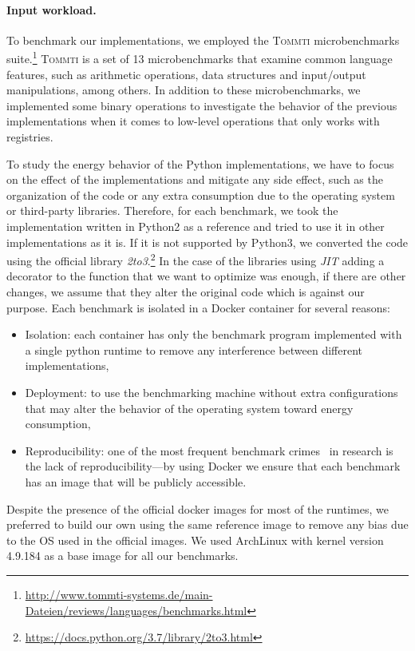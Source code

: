 \paragraph{Input workload.}
To benchmark our implementations, we employed the \textsc{Tommti} microbenchmarks suite.\footnote{\url{http://www.tommti-systems.de/main-Dateien/reviews/languages/benchmarks.html}}
\textsc{Tommti} is a set of 13 microbenchmarks that examine common language features, such as arithmetic operations, data structures and input/output manipulations, among others.
In addition to these microbenchmarks, we implemented some binary operations to investigate the behavior of the previous implementations when it comes to low-level operations that only works with registries.

To study the energy behavior of the Python implementations, we have to focus on the effect of the implementations and mitigate any side effect, such as the organization of the code or any extra consumption due to the operating system or third-party libraries.
Therefore, for each benchmark, we took the implementation written in Python2 as a reference and tried to use it in other implementations as it is.
If it is not supported by Python3, we converted the code using the official library \emph{2to3}.\footnote{\url{https://docs.python.org/3.7/library/2to3.html}}
In the case of the libraries using \emph{JIT} adding a decorator to the function that we want to optimize was enough, if there are other changes, we assume that they alter the original code which is against our purpose.
Each benchmark is isolated in a Docker container for several reasons:
\begin{itemize}
      \item Isolation: each container has only the benchmark program implemented with a single python runtime to remove any interference between different implementations,
      \item Deployment: to use the benchmarking machine without extra configurations that may alter the behavior of the operating system toward energy consumption,
      \item Reproducibility: one of the most frequent benchmark crimes~\cite{DBLP:journals/corr/abs-1801-02381} in research is the lack of reproducibility---by using Docker we ensure that each benchmark has an image that will be publicly accessible.
\end{itemize}

Despite the presence of the official docker images for most of the runtimes, we preferred to build our own using the same reference image to remove any bias due to the OS used in the official images.
We used ArchLinux with kernel version 4.9.184 as a base image for all our benchmarks.

